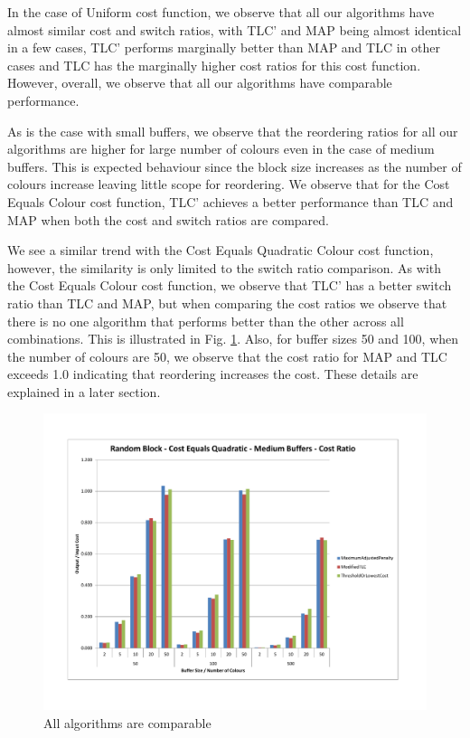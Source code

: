 In the case of Uniform cost function, we observe that all our algorithms have almost similar cost and switch ratios, with TLC' and MAP being almost identical in a few cases, TLC' performs marginally better than MAP and TLC in other cases and TLC has the marginally higher cost ratios for this cost function. However, overall, we observe that all our algorithms have comparable performance.  

As is the case with small buffers, we observe that the reordering ratios for all our algorithms are higher for large number of colours even in the case of medium buffers. This is expected behaviour since the block size increases as the number of colours increase leaving little scope for reordering. We observe that for the Cost Equals Colour cost function, TLC' achieves a better performance than TLC and MAP when both the cost and switch ratios are compared. 

We see a similar trend with the Cost Equals Quadratic Colour cost function, however, the similarity is only limited to the switch ratio comparison. As with the Cost Equals Colour cost function, we observe that TLC' has a better switch ratio than TLC and MAP, but when comparing the cost ratios we observe that there is no one algorithm that performs better than the other across all combinations. This is illustrated in Fig. \ref{randomBlockCQMediumCost}. Also, for buffer sizes 50 and 100, when the number of colours are 50, we observe that the cost ratio for MAP and TLC exceeds 1.0 indicating that reordering increases the cost. These details are explained in a later section. 

\begin{figure}[ht]
\centering 
\includegraphics[scale=0.60]{Random-Block-cq-medium-cost.pdf}
\caption{All algorithms are comparable}
\label{randomBlockCQMediumCost}
\end{figure}   

